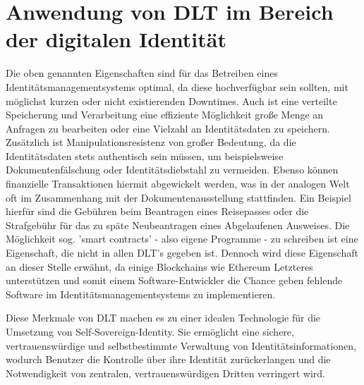 \section{Anwendung von DLT im Bereich der digitalen Identität}
Die oben genannten Eigenschaften sind für das Betreiben eines Identitätsmanagementsystems optimal, da diese hochverfügbar sein sollten, mit möglichst kurzen oder nicht existierenden Downtimes. Auch ist eine verteilte Speicherung und Verarbeitung eine effiziente Möglichkeit große Menge an Anfragen zu bearbeiten oder eine Vielzahl an Identitätsdaten zu speichern. Zusätzlich ist Manipulationsresistenz von großer Bedeutung, da die Identitätsdaten stets authentisch sein müssen, um beispielsweise Dokumentenfälschung oder Identitätsdiebstahl zu vermeiden. Ebenso können finanzielle Transaktionen hiermit abgewickelt werden, was in der analogen Welt oft im Zusammenhang mit der Dokumentenausstellung stattfinden. Ein Beispiel hierfür sind die Gebühren beim Beantragen eines Reisepasses oder die Strafgebühr für das zu späte Neubeantragen eines Abgelaufenen Ausweises.
Die Möglichkeit sog. 'smart contracts' - also eigene Programme - zu schreiben ist eine Eigenschaft, die nicht in allen DLT's gegeben ist. Dennoch wird diese Eigenschaft an dieser Stelle erwähnt, da einige Blockchains wie Ethereum Letzteres unterstützen und somit einem Software-Entwickler die Chance geben fehlende Software im Identitätsmanagementsystems zu implementieren.

Diese Merkmale von DLT machen es zu einer idealen Technologie für die Umsetzung von Self-Sovereign-Identity. Sie ermöglicht eine sichere, vertrauenswürdige und selbstbestimmte Verwaltung von Identitätsinformationen, wodurch Benutzer die Kontrolle über ihre Identität zurückerlangen und die Notwendigkeit von zentralen, vertrauenswürdigen Dritten verringert wird.
